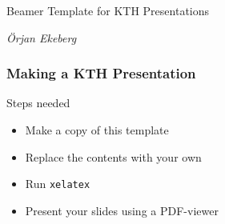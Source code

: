 \documentclass[aspectratio=1610]{beamer}
\begin{document}


\begin{frame}

  \vspace{0.02\textheight}
  
  \begin{Large}
    Beamer Template for KTH Presentations
  \end{Large}

  \vspace{0.1\textheight}

  \begin{small}
    \textit{Örjan Ekeberg}
  \end{small}
\end{frame}




\begin{frame}
  \frametitle{\hfill Making a KTH Presentation}

  \begin{block}{Steps needed}
    \begin{itemize}
    \item Make a copy of this template
    \item Replace the contents with your own
    \item Run \texttt{xelatex}
    \item Present your slides using a PDF-viewer
    \end{itemize}
  \end{block}

\end{frame}
\end{document}
